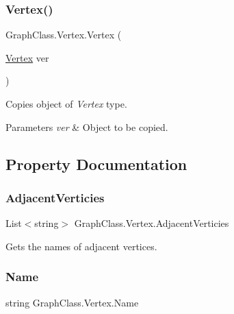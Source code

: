 \subsubsection{\texorpdfstring{Vertex()}{Vertex()}\hspace{0.1cm}{\footnotesize\ttfamily [2/2]}}
{\footnotesize\ttfamily Graph\+Class.\+Vertex.\+Vertex (\begin{DoxyParamCaption}\item[{\hyperlink{class_graph_class_1_1_vertex}{Vertex}}]{ver }\end{DoxyParamCaption})\hspace{0.3cm}{\ttfamily [inline]}}



Copies object of {\itshape Vertex}  type. 


\begin{DoxyParams}{Parameters}
{\em ver} & Object to be copied.\\
\hline
\end{DoxyParams}


\subsection{Property Documentation}
\mbox{\label{class_graph_class_1_1_vertex_ab943a98fd4ea8faf7056f9388c5f9bef}} 
\subsubsection{\texorpdfstring{Adjacent\+Verticies}{AdjacentVerticies}}
{\footnotesize\ttfamily List$<$string$>$ Graph\+Class.\+Vertex.\+Adjacent\+Verticies\hspace{0.3cm}{\ttfamily [get]}}



Gets the names of adjacent vertices. 

\mbox{\label{class_graph_class_1_1_vertex_a218ad4b509e5c08d080eb2d705fd9ccb}} 
\subsubsection{\texorpdfstring{Name}{Name}}
{\footnotesize\ttfamily string Graph\+Class.\+Vertex.\+Name\hspace{0.3cm}{\ttfamily [get]}}



